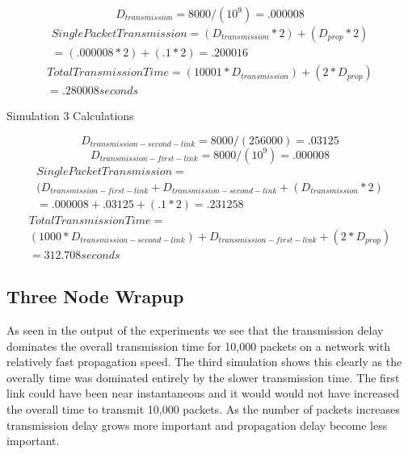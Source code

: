 \documentclass[12pt]{article}
\begin{document}
\begin{equation}
D_{transmission} = 8000 / (10^9) = .000008
\end{equation}
\begin{equation}
\begin{split}
SinglePacketTransmission = ( D_{transmission} * 2) + (D_{prop} * 2) \\= (.000008 * 2) + (.1 * 2) = .200016
\end{split}
\end{equation}
\begin{equation}
\begin{split}
TotalTransmissionTime = (10001 * D_{transmission}) + (2 * D_{prop}) \\= .280008 seconds
\end{split}
\end{equation}

\centerline{Simulation 3 Calculations}
\begin{equation}
D_{transmission-second-link} = 8000 / (256000) = .03125
\end{equation}
\begin{equation}
D_{transmission-first-link} = 8000 / (10^9) = .000008
\end{equation}
\begin{equation}
\begin{split}
SinglePacketTransmission =\\ ( D_{transmission-first-link} + D_{transmission-second-link}  + (D_{transmission} * 2) \\= .000008 + .03125 + (.1 * 2) = .231258
\end{split}
\end{equation}
\begin{equation}
\begin{split}
TotalTransmissionTime =\\ (1000 * D_{transmission-second-link}) + D_{transmission-first-link} + (2 * D_{prop}) \\= 312.708 seconds
\end{split}
\end{equation}

\subsection{Three Node Wrapup}
As seen in the output of the experiments we see that the transmission delay dominates the overall transmission time for 10,000 packets on a network with relatively fast propagation speed. The third simulation shows this clearly as the overally time was dominated entirely by the slower transmission time. The first link could have been near instantaneous and it would would not have increased the overall time to transmit 10,000 packets. As the number of packets increases transmission delay grows more important and propagation delay become less important. 
\end{document}
